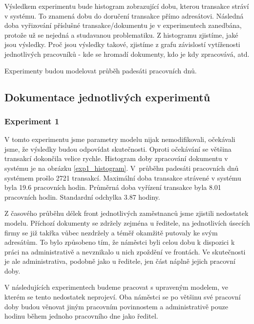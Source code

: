 \documentclass[12pt,a4paper]{article}
\begin{document}
Výsledkem experimentu bude histogram zobrazující dobu, kterou transakce stráví v systému. To znamená dobu do doručení transakce přímo adresátovi. Následná doba vyřizování příslušné transakce/dokumentu je v experimentech zanedbána, protože už se nejedná a studavanou problematiku. Z histogramu zjistíme, jaké jsou výsledky. Proč jsou výsledky takové, zjistíme z grafu závislostí vytíženosti jednotlivých pracovníků - kde se hromadí dokumenty, kdo je kdy zpracovává, atd. 

%
%
%
%

Experimenty budou modelovat průběh padesáti pracovních dnů.

\subsection{Dokumentace jednotlivých experimentů}
\subsubsection{Experiment 1}
V tomto experimentu jsme parametry modelu nijak nemodifikovali, očekávali jsme, že výsledky budou odpovídat skutečnosti.
Oproti očekávání se většina transakcí dokončila velice rychle.
Histogram doby zpracování dokumentu v systému je na obrázku \ref{exp1_histogram}.
V~průběhu padesáti pracovních dnů systémem prošlo 2721 transakcí.
Ma\-xi\-mál\-ní doba trans\-ak\-ce strávené v systému byla 19.6 pracovních hodin.
Průměrná doba vyřízení transakce byla 8.01 pracovních hodin. Standardní odchylka 3.87 hodiny.

Z časového průběhu délek front jednotlivých zaměstnanců jsme zjistili nedostatek mo\-de\-lu.
Příchozí dokumenty se zdržely zejména u ředitele, na jednotlivích úsecích firmy se již takřka vůbec nezdržely a téměř okamžitě putovaly ke svým adresátům.
To bylo způsobeno tím, že náměstci byli celou dobu k dispozici k práci na administrativě a nevznikalo u nich zpoždění ve frontách.
Ve skutečnosti je ale administrativa, podobně jako u ředitele, jen část náplně jejich pracovní doby.

V následujících experimentech budeme pracovat s upraveným modelem, ve kterém se tento nedostatek neprojeví.
Oba náměstci se po většinu své pracovní doby budou věnovat jiným pracovním povinnostem a administrativě  
pouze hodinu během jednoho pracovního dne jako ředitel.
\end{document}
